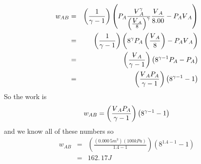 \documentclass{article}
\begin{document}
\begin{eqnarray*}
w_{AB} &=&\left( \frac{1}{\gamma -1}\right) \left( P_{A}\frac{%
\ooalign{\hfil$V$\hfil\cr\kern0.1em--\hfil\cr}%
_{A}^{\gamma }}{\left( \frac{%
\ooalign{\hfil$V$\hfil\cr\kern0.1em--\hfil\cr}%
_{A}}{8}\right) ^{\gamma }}\frac{%
\ooalign{\hfil$V$\hfil\cr\kern0.1em--\hfil\cr}%
_{A}}{8.00}-P_{A}%
\ooalign{\hfil$V$\hfil\cr\kern0.1em--\hfil\cr}%
_{A}\right) \\
&=&\left( \frac{1}{\gamma -1}\right) \left( 8^{\gamma }P_{A}\left( \frac{%
\ooalign{\hfil$V$\hfil\cr\kern0.1em--\hfil\cr}%
_{A}}{8}\right) -P_{A}%
\ooalign{\hfil$V$\hfil\cr\kern0.1em--\hfil\cr}%
_{A}\right) \\
&=&\left( \frac{%
\ooalign{\hfil$V$\hfil\cr\kern0.1em--\hfil\cr}%
_{A}}{\gamma -1}\right) \left( 8^{\gamma -1}P_{A}-P_{A}\right) \\
&=&\left( \frac{%
\ooalign{\hfil$V$\hfil\cr\kern0.1em--\hfil\cr}%
_{A}P_{A}}{\gamma -1}\right) \left( 8^{\gamma -1}-1\right)
\end{eqnarray*}%
So the work is 
\[
w_{AB}=\left( \frac{%
\ooalign{\hfil$V$\hfil\cr\kern0.1em--\hfil\cr}%
_{A}P_{A}}{\gamma -1}\right) \left( 8^{\gamma -1}-1\right) 
\]%
and we know all of these numbers so 
\begin{eqnarray*}
w_{AB} &=&\left( \frac{\left( \allowbreak 0.000\,5\unit{m}^{3}\right) \left(
100\unit{kPa}\right) }{1.4-1}\right) \left( 8^{1.4-1}-1\right) \\
&=&\allowbreak 162.\,\allowbreak 17\unit{J}
\end{eqnarray*}
\end{document}
